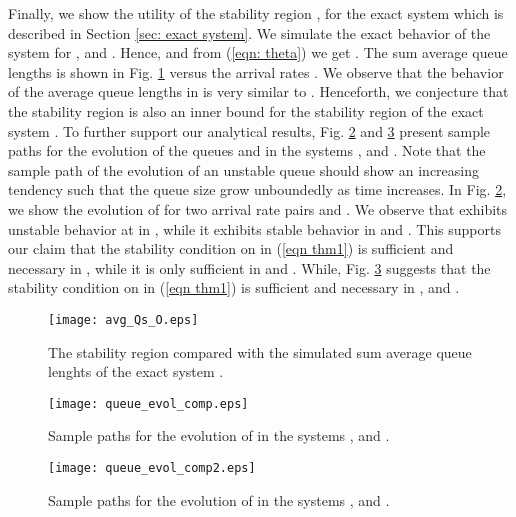 \documentclass[draftcls,12pt,onecolumn]{IEEEtran}
\begin{document}
\indent Finally, we show the utility of the stability region , for the exact system  which is described in Section \ref{sec: exact system}. We simulate the exact behavior of the system for ,  and . Hence,  and from (\ref{eqn: theta}) we get . The sum average queue lengths is shown in Fig. \ref{fig: eval avg_Qs O} versus the arrival rates . We observe that the behavior of the average queue lengths in  is very similar to . Henceforth, we conjecture that the stability region  is also an inner bound for the stability region of the exact system . To further support our analytical results, Fig. \ref{fig: sample path Q2} and \ref{fig: sample path Q1} present sample paths for the evolution of the queues  and  in the systems ,  and . Note that the sample path of the evolution of an unstable queue should show an increasing tendency such that the queue size grow unboundedly as time increases. In Fig. \ref{fig: sample path Q2}, we show the evolution of  for two arrival rate pairs  and . We observe that  exhibits unstable behavior at  in , while it exhibits stable behavior in  and . This supports our claim that the stability condition on  in (\ref{eqn thm1}) is sufficient and necessary in , while it is only sufficient in  and . While, Fig. \ref{fig: sample path Q1} suggests that the stability condition on  in (\ref{eqn thm1}) is sufficient and necessary in ,  and . 


\begin{figure}[t]
\texttt{[image: avg\_Qs\_O.eps]} 
\centering
\caption{The stability region  compared with the simulated sum average queue lenghts of the exact system . }\label{fig: eval avg_Qs O}
\end{figure}

\begin{figure}[t]
\texttt{[image: queue\_evol\_comp.eps]} 
\centering
\caption{Sample paths for the evolution of  in the systems ,  and . }\label{fig: sample path Q2}
\end{figure}

\begin{figure}[t]
\texttt{[image: queue\_evol\_comp2.eps]} 
\centering
\caption{Sample paths for the evolution of  in the systems ,  and . }\label{fig: sample path Q1}
\end{figure}
\end{document}
